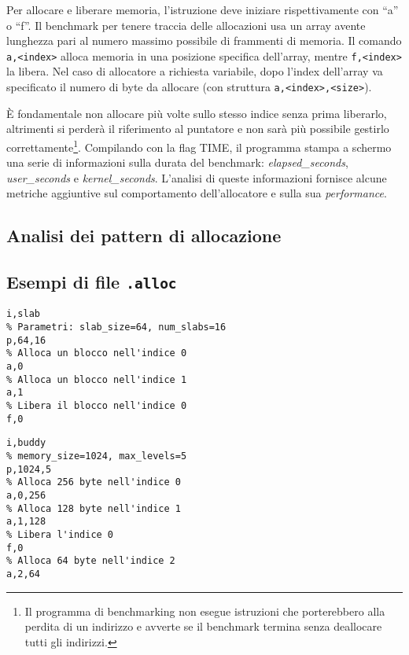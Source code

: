 Per allocare e liberare memoria, l’istruzione deve iniziare rispettivamente con ``a'' o ``f''. Il benchmark per tenere traccia delle allocazioni usa un array avente lunghezza pari al numero massimo possibile di frammenti di memoria. Il comando \texttt{a,<index>} alloca memoria in una posizione specifica dell'array, mentre \texttt{f,<index>} la libera. Nel caso di allocatore a richiesta variabile, dopo l’index dell’array va specificato il numero di byte da allocare (con struttura \texttt{a,<index>,<size>}). 

È fondamentale non allocare più volte sullo stesso indice senza prima liberarlo, altrimenti si perderà il riferimento al puntatore e non sarà più possibile gestirlo correttamente\footnote{Il programma di benchmarking non esegue istruzioni che porterebbero alla perdita di un indirizzo e avverte se il benchmark termina senza deallocare tutti gli indirizzi.}. Compilando con la flag TIME, il programma stampa a schermo una serie di informazioni sulla durata del benchmark: \textit{elapsed\_seconds}, \textit{user\_seconds} e \textit{kernel\_seconds}. L'analisi di queste informazioni fornisce alcune metriche aggiuntive sul comportamento dell'allocatore e sulla sua \textit{performance}.

\subsection{Analisi dei pattern di allocazione}




\pagebreak

\subsection{Esempi di file \texttt{.alloc}}
\begin{lstlisting}[language={}]
% Tipo di allocatore (Slab)
i,slab         
% Parametri: slab_size=64, num_slabs=16
p,64,16        
% Alloca un blocco nell'indice 0
a,0            
% Alloca un blocco nell'indice 1
a,1            
% Libera il blocco nell'indice 0
f,0      
\end{lstlisting}      
\begin{lstlisting}[language={}]
% Benchmark per allocatore variabile
i,buddy
% memory_size=1024, max_levels=5
p,1024,5       
% Alloca 256 byte nell'indice 0
a,0,256        
% Alloca 128 byte nell'indice 1
a,1,128        
% Libera l'indice 0
f,0            
% Alloca 64 byte nell'indice 2
a,2,64         
\end{lstlisting}




